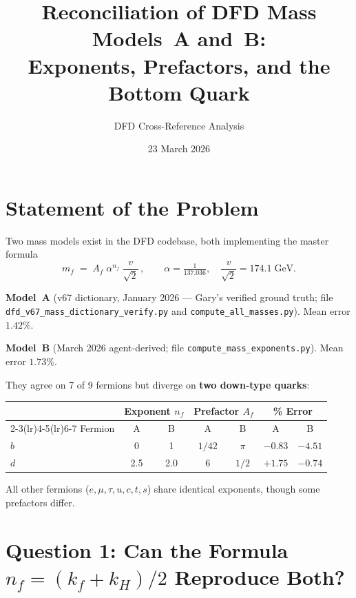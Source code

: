 \documentclass[11pt]{article}
\title{Reconciliation of DFD Mass Models~A and~B:\\
  Exponents, Prefactors, and the Bottom Quark}
\author{DFD Cross-Reference Analysis}
\date{23 March 2026}
\begin{document}
\maketitle

\section{Statement of the Problem}

Two mass models exist in the DFD codebase, both implementing the master
formula
\begin{equation}\label{eq:master}
  m_f \;=\; A_f\;\alpha^{n_f}\;\frac{v}{\sqrt{2}}\,,
  \qquad \alpha=\tfrac{1}{137.036},\quad
  \frac{v}{\sqrt{2}}=174.1\;\mathrm{GeV}.
\end{equation}

\noindent
\textbf{Model~A} (v67 dictionary, January 2026 --- Gary's verified
ground truth; file \texttt{dfd\_v67\_mass\_dictionary\_verify.py} and
\texttt{compute\_all\_masses.py}). Mean error $1.42\%$.

\medskip\noindent
\textbf{Model~B} (March 2026 agent-derived; file
\texttt{compute\_mass\_exponents.py}). Mean error $1.73\%$.

\medskip\noindent
They agree on 7 of 9 fermions but diverge on \textbf{two down-type quarks}:

\begin{center}
\begin{tabular}{lcccccc}
\toprule
& \multicolumn{2}{c}{Exponent $n_f$}
& \multicolumn{2}{c}{Prefactor $A_f$}
& \multicolumn{2}{c}{\% Error} \\
\cmidrule(lr){2-3}\cmidrule(lr){4-5}\cmidrule(lr){6-7}
Fermion & A & B & A & B & A & B \\
\midrule
$b$ & \color{alert}0   & \color{alert}1   & $1/42$      & $\pi$          & $-0.83$ & $-4.51$ \\
$d$ & \color{alert}2.5 & \color{alert}2.0 & $6$         & $1/2$          & $+1.75$ & $-0.74$ \\
\bottomrule
\end{tabular}
\end{center}

All other fermions ($e,\mu,\tau,u,c,t,s$) share identical exponents,
though some prefactors differ.

\section{Question 1: Can the Formula $n_f=(k_f+k_H)/2$ Reproduce Both?}
\end{document}
